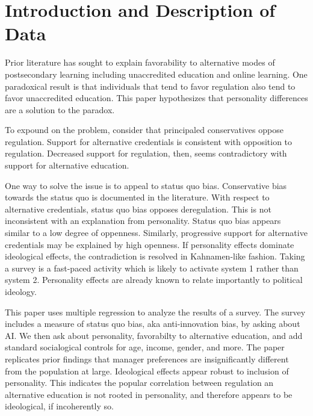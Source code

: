 \documentclass[review]{elsarticle}
\begin{document}
\pagebreak
\linenumbers

\section{Introduction and Description of Data}

Prior literature has sought to explain favorability
to alternative modes of postsecondary learning
including unaccredited education and online learning.
One paradoxical result is that individuals that tend to favor regulation
also tend to favor unaccredited education\cite{vandivier2020preliminary}.
This paper hypothesizes that personality differences are a solution to the paradox.

To expound on the problem,
consider that principaled conservatives oppose regulation\cite{teghtsoonian1993neo}.
Support for alternative credentials is consistent with opposition to regulation.
Decreased support for regulation, then, seems contradictory with support for alternative education.

One way to solve the issue is to appeal to status quo bias.
Conservative bias towards the status quo is documented in the literature\cite{eidelman2012bias}.
With respect to alternative credentials, status quo bias opposes deregulation.
This is not inconsistent with an explanation from personality.
Status quo bias appears similar to a low degree of oppenness.
Similarly, progressive support for alternative credentials may be explained by high openness.
If personality effects dominate ideological effects, the contradiction is resolved in Kahnamen-like fashion\cite{kahneman2011thinking}.
Taking a survey is a fast-paced activity which is likely to activate system 1 rather than system 2.
Personality effects are already known to relate importantly to political ideology\cite{chirumbolo2010personality}.

This paper uses multiple regression to analyze the results of a survey.
The survey includes a measure of status quo bias, aka anti-innovation bias, by asking about AI.
We then ask about personality, favorabilty to alternative education, and add standard socialogical controls for age, income, gender, and more.
The paper replicates prior findings that manager preferences are insignificantly different from the population at large.
Ideological effects appear robust to inclusion of personality.
This indicates the popular correlation between regulation an alternative education is not rooted in personality,
and therefore appears to be ideological, if incoherently so.
\end{document}
